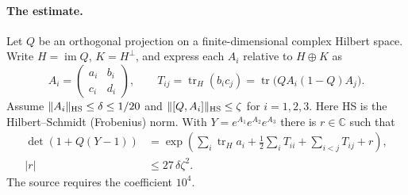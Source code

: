\documentclass[11pt,letterpaper]{article}
\begin{document}
\paragraph{The estimate.}
Let $Q$ be an orthogonal projection on a finite-dimensional complex Hilbert space. Write $H=\operatorname{im}Q$, $K=H^\perp$, and express each $A_i$ relative to $H\oplus K$ as
\[
 A_i=\begin{pmatrix}a_i&b_i\\c_i&d_i\end{pmatrix},\qquad
 T_{ij}=\operatorname{tr}_H(b_ic_j)
       =\operatorname{tr}\bigl(QA_i(1-Q)A_j\bigr).
\]
Assume $\|A_i\|_{\rm HS}\le\delta\le 1/20$ and
$\|[Q,A_i]\|_{\rm HS}\le\zeta$ for $i=1,2,3$.
Here HS is the Hilbert--Schmidt (Frobenius) norm. With $Y=e^{A_1}e^{A_2}e^{A_3}$ there is $r\in\mathbb C$ such that
\begin{align*}
 \det(1+Q(Y-1)) &=
 \exp\!\left(\sum_i\operatorname{tr}_H a_i+
       \tfrac12\sum_i T_{ii}+\sum_{i<j}T_{ij}+r\right),\\
 |r|&\le 27\,\delta\zeta^2.
\end{align*}
The source requires the coefficient $10^4$.
\end{document}
